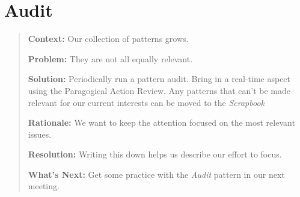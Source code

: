 \section{Audit}

\begin{quote}
\textbf{Context:} Our collection of patterns grows.

\textbf{Problem:} They are not all equally relevant.

\textbf{Solution:} Periodically run a pattern audit.  Bring in a real-time aspect using the Paragogical Action Review.  Any patterns that can't be made relevant for our current interests can be moved to the \emph{Scrapbook}

\textbf{Rationale:} We want to keep the attention focused on the most relevant issues.

\textbf{Resolution:} Writing this down helps us describe our effort to focus.

\textbf{What's Next:} Get some practice with the \emph{Audit} pattern in our next meeting.
\end{quote}